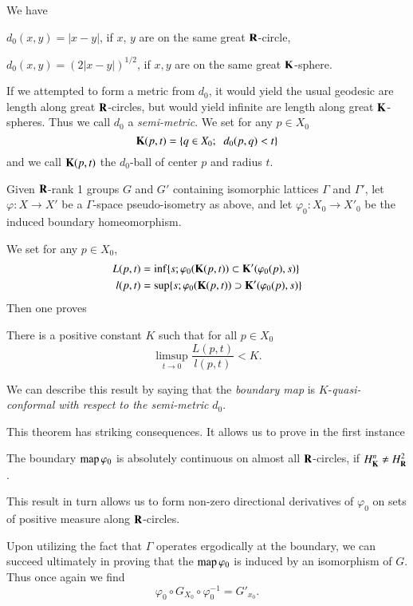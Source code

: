 We have

$d_0 (x,y) = |x-y|$, if $x$, $y$ are on the same great $\mathbf{R}$-circle,

$d_0 (x,y) = (2 |x-y|)^{1/2}$, if $x,y$ are on the same great $\mathbf{K}$-sphere.

If we attempted to form a metric from $d_0$, it would yield the usual geodesic are length along great $\mathbf{R}$-circles, but would yield infinite are length along great $\mathbf{K}$-spheres. Thus we call $d_0$ a \textit{semi-metric}. We set for any $p\in X_0$
$$
\mathbf{K} (p, t) = \{q \in X_0 ; \;\; d_0 (p, q) < t\}
$$
and we call $\mathbf{K} (p,t)$ the $d_0$-ball of center $p$ and radius $t$.

Given $\mathbf{R}$-rank 1 groups $G$ and $G'$ containing isomorphic lattices $\Gamma$ and $\Gamma'$, let $\varphi: X \to X'$ be a $\Gamma$-space pseudo-isometry as above, and let $\varphi_0 : X_0 \to X'_0$ be the induced boundary homeomorphism.

We set for any $p \in X_0$,
\begin{align*}
L (p,t) & = \inf \{s; \varphi_0 (\mathbf{K} (p,t)) \subset \mathbf{K}' (\varphi_0 (p), s)\}\\
l(p,t) & = \sup \{s; \varphi_0 (\mathbf{K} (p,t)) \supset \mathbf{K}' (\varphi_0 (p), s)\}
\end{align*}
Then one proves

\begin{theorem*}
There is a positive constant $K$ such that for all $p \in X_0$
$$
{\displaystyle{\mathop{\lim\sup}_{t \to 0}}} \frac{L(p,t)}{l (p,t)} < K.
$$
\end{theorem*}

We can describe this result by saying that the \textit{boundary map} is $K$-\textit{quasi-conformal with respect to the semi-metric} $d_0$.

This theorem has striking consequences. It allows us to prove in the first instance

\begin{theorem*}
The boundary $\operatorname{map} \varphi_0$ is absolutely continuous on almost all $\mathbf{R}$-circles, if $H^n_{\mathbf{K}} \neq H^2_{\mathbf{R}}$.
\end{theorem*}

This result in turn allows us to form non-zero directional derivatives of $\varphi_0$ on sets of positive measure along $\mathbf{R}$-circles.

Upon utilizing the fact that $\Gamma$ operates ergodically at the boundary, we can succeed ultimately in proving that the $\operatorname{map} \varphi_0$ is induced by an isomorphism of $G$. Thus once again we find 
$$
\varphi_0 \circ G_{X_0} \circ \varphi^{-1}_0 = G'_{x_0}.
$$

